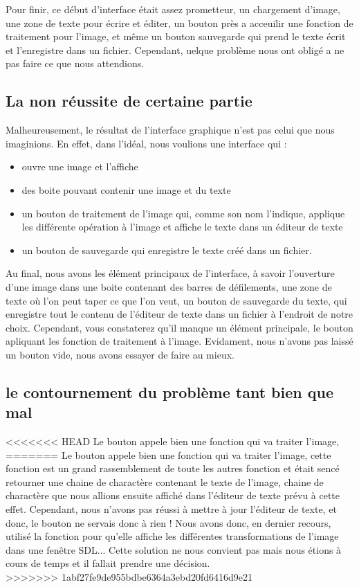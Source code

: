 	Pour finir, ce début d'interface était assez prometteur, un chargement d'image, une zone de texte pour écrire et éditer, un bouton près a acceuilir une fonction de traitement pour l'image, et même un bouton sauvegarde qui prend le texte écrit et l'enregistre dans un fichier. Cependant, uelque problème nous ont obligé a ne pas faire ce que nous attendions.


	\subsection{La non réussite de certaine partie}

	Malheureusement, le résultat de l'interface graphique n'est pas celui que nous imaginions. En effet, dans l'idéal, nous voulions une interface qui :\\
	\begin{itemize}
		\item ouvre une image et l'affiche
		\item des boite pouvant contenir une image et du texte
		\item un bouton de traitement de l'image qui, comme son nom l'indique, applique les différente opération à l'image et affiche le texte dans un éditeur de texte
		\item un bouton de sauvegarde qui enregistre le texte créé dans un fichier.\\
	\end{itemize}
	Au final, nous avons les élément principaux de l'interface, à savoir l'ouverture d'une image dans une boite contenant des barres de défilements, une zone de texte où l'on peut taper ce que l'on veut, un bouton de sauvegarde du texte, qui enregistre tout le contenu de l'éditeur de texte dans un fichier à l'endroit de notre choix. Cependant, vous constaterez qu'il manque un élément principale, le bouton apliquant les fonction de traitement à l'image. Evidament, nous n'avons pas laissé un bouton vide, nous avons essayer de faire au mieux.

	\subsection{le contournement du problème tant bien que mal}
<<<<<<< HEAD
	Le bouton appele bien une fonction qui va traiter l'image,
=======
	Le bouton appele bien une fonction qui va traiter l'image, cette fonction est un grand rassemblement de toute les autres fonction et était sencé retourner une chaine de charactère contenant le texte de l'image, chaine de charactère que nous allions ensuite affiché dans l'éditeur de texte prévu à cette effet. Cependant, nous n'avons pas réussi à mettre à jour l'éditeur de texte, et donc, le bouton ne servais donc à rien ! Nous avons donc, en dernier recours, utilisé la fonction pour qu'elle affiche les différentes transformations de l'image dans une fenêtre SDL... Cette solution ne nous convient pas mais nous étions à cours de temps et il fallait prendre une décision.\\
>>>>>>> 1abf27fe9de955bdbe6364a3ebd20fd6416d9e21
